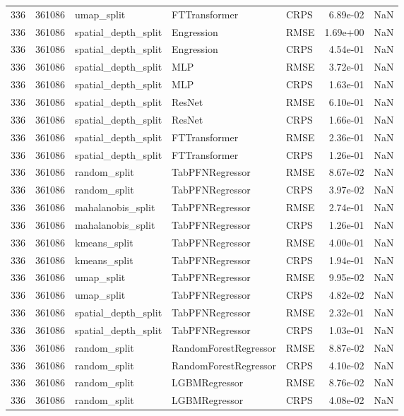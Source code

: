\begin{tabular}{rrlllrr}
336 & 361086 & umap\_split & FTTransformer & CRPS & 6.89e-02 & NaN \\
336 & 361086 & spatial\_depth\_split & Engression & RMSE & 1.69e+00 & NaN \\
336 & 361086 & spatial\_depth\_split & Engression & CRPS & 4.54e-01 & NaN \\
336 & 361086 & spatial\_depth\_split & MLP & RMSE & 3.72e-01 & NaN \\
336 & 361086 & spatial\_depth\_split & MLP & CRPS & 1.63e-01 & NaN \\
336 & 361086 & spatial\_depth\_split & ResNet & RMSE & 6.10e-01 & NaN \\
336 & 361086 & spatial\_depth\_split & ResNet & CRPS & 1.66e-01 & NaN \\
336 & 361086 & spatial\_depth\_split & FTTransformer & RMSE & 2.36e-01 & NaN \\
336 & 361086 & spatial\_depth\_split & FTTransformer & CRPS & 1.26e-01 & NaN \\
336 & 361086 & random\_split & TabPFNRegressor & RMSE & 8.67e-02 & NaN \\
336 & 361086 & random\_split & TabPFNRegressor & CRPS & 3.97e-02 & NaN \\
336 & 361086 & mahalanobis\_split & TabPFNRegressor & RMSE & 2.74e-01 & NaN \\
336 & 361086 & mahalanobis\_split & TabPFNRegressor & CRPS & 1.26e-01 & NaN \\
336 & 361086 & kmeans\_split & TabPFNRegressor & RMSE & 4.00e-01 & NaN \\
336 & 361086 & kmeans\_split & TabPFNRegressor & CRPS & 1.94e-01 & NaN \\
336 & 361086 & umap\_split & TabPFNRegressor & RMSE & 9.95e-02 & NaN \\
336 & 361086 & umap\_split & TabPFNRegressor & CRPS & 4.82e-02 & NaN \\
336 & 361086 & spatial\_depth\_split & TabPFNRegressor & RMSE & 2.32e-01 & NaN \\
336 & 361086 & spatial\_depth\_split & TabPFNRegressor & CRPS & 1.03e-01 & NaN \\
336 & 361086 & random\_split & RandomForestRegressor & RMSE & 8.87e-02 & NaN \\
336 & 361086 & random\_split & RandomForestRegressor & CRPS & 4.10e-02 & NaN \\
336 & 361086 & random\_split & LGBMRegressor & RMSE & 8.76e-02 & NaN \\
336 & 361086 & random\_split & LGBMRegressor & CRPS & 4.08e-02 & NaN \\

\end{tabular}

